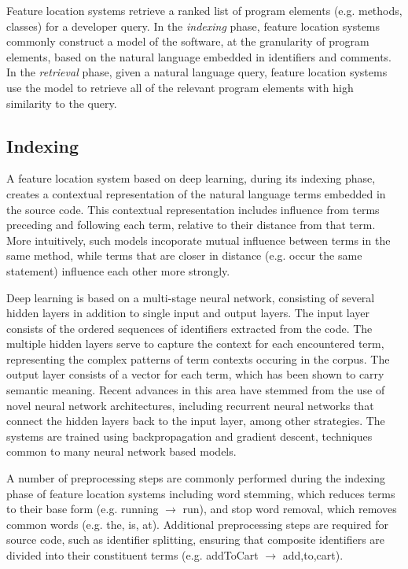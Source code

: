 
%      
%

Feature location systems retrieve a ranked list of program elements
(e.g. methods, classes) for a developer query. In the {\em indexing}
phase, feature location systems commonly construct a model of the
software, at the granularity of program elements, based on the natural
language embedded in identifiers and comments. In the {\em retrieval}
phase, given a natural language query, feature location systems use
the model to retrieve all of the relevant program elements with high
similarity to the query.

\subsection{Indexing}

A feature location system based on deep learning, during its indexing
phase, creates a contextual representation of the natural language
terms embedded in the source code. This contextual representation
includes influence from terms preceding and following each term,
relative to their distance from that term. More intuitively, such
models incoporate mutual influence between terms in the same method,
while terms that are closer in distance (e.g. occur the same
statement) influence each other more strongly. 


Deep learning is based on a multi-stage neural network, consisting of
several hidden layers in addition to single input and output layers.
The input layer consists of the ordered sequences of identifiers
extracted from the code. The multiple hidden layers serve to capture
the context for each encountered term, representing the complex
patterns of term contexts occuring in the corpus. The output layer
consists of a vector for each term, which has been shown to carry
semantic meaning. Recent advances in this area have stemmed from the
use of novel neural network architectures, including recurrent neural
networks that connect the hidden layers back to the input layer, among
other strategies. The systems are trained using backpropagation and
gradient descent, techniques common to many neural network based
models.

 
A number of preprocessing steps are commonly performed during the
indexing phase of feature location systems including word stemming,
which reduces terms to their base form (e.g. running $\rightarrow$
run), and stop word removal, which removes common words (e.g. the, is,
at). Additional preprocessing steps are required for source code, such
as identifier splitting, ensuring that composite identifiers are
divided into their constituent terms (e.g. addToCart $\rightarrow$
add,to,cart).


